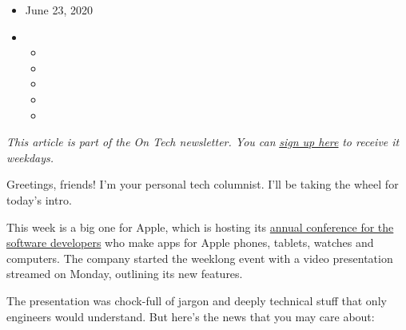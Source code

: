 \begin{itemize}
\item
  June 23, 2020
\item
  \begin{itemize}
  \item
  \item
  \item
  \item
  \item
  \end{itemize}
\end{itemize}

\emph{This article is part of the On Tech newsletter. You can}
\href{https://www.nytimes3xbfgragh.onion/newsletters/signup/OT}{\emph{sign
up here}} \emph{to receive it weekdays.}

Greetings, friends! I'm your personal tech columnist. I'll be taking the
wheel for today's intro.

This week is a big one for Apple, which is hosting its
\href{https://www.nytimes3xbfgragh.onion/2020/06/22/technology/apple-macs-intel-chips.html}{annual
conference for the software developers} who make apps for Apple phones,
tablets, watches and computers. The company started the weeklong event
with a video presentation streamed on Monday, outlining its new
features.

The presentation was chock-full of jargon and deeply technical stuff
that only engineers would understand. But here's the news that you may
care about:

